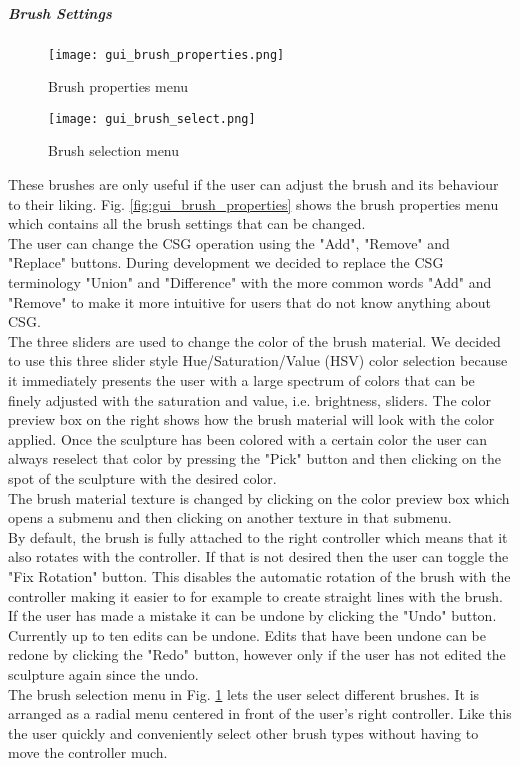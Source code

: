 \subparagraph{Brush Settings}

\begin{figure}[!htb]
\texttt{[image: gui\_brush\_properties.png]}
\caption{Brush properties menu}
\label{fig:gui_brush_properties}
\endminipage\hfill
{}
\texttt{[image: gui\_brush\_select.png]}
\caption{Brush selection menu}
\label{fig:gui_brush_select}
\endminipage\hfill
\end{figure}

These brushes are only useful if the user can adjust the brush and its behaviour to their liking. Fig. \ref{fig:gui_brush_properties} shows the brush properties menu which contains all the brush settings that can be changed.\\
The user can change the CSG operation using the "Add", "Remove" and "Replace" buttons. During development we decided to replace the CSG terminology "Union" and "Difference" with the more common words "Add" and "Remove" to make it more intuitive for users that do not know anything about CSG.\\
The three sliders are used to change the color of the brush material. We decided to use this three slider style Hue/Saturation/Value (HSV) color selection because it immediately presents the user with a large spectrum of colors that can be finely adjusted with the saturation and value, i.e. brightness, sliders. The color preview box on the right shows how the brush material will look with the color applied. Once the sculpture has been colored with a certain color the user can always reselect that color by pressing the "Pick" button and then clicking on the spot of the sculpture with the desired color.\\
The brush material texture is changed by clicking on the color preview box which opens a submenu and then clicking on another texture in that submenu.\\
By default, the brush is fully attached to the right controller which means that it also rotates with the controller. If that is not desired then the user can toggle the
"Fix Rotation" button. This disables the automatic rotation of the brush with the controller making it easier to for example to create straight lines with the brush.\\
If the user has made a mistake it can be undone by clicking the "Undo" button. Currently up to ten edits can be undone. Edits that have been undone can be redone by clicking the "Redo" button, however only if the user has not edited the sculpture again since the undo.\\
The brush selection menu in Fig. \ref{fig:gui_brush_select} lets the user select different brushes. It is arranged as a radial menu centered in front of the user's right controller. Like this the user quickly and conveniently select other brush types without having to move the controller much.

